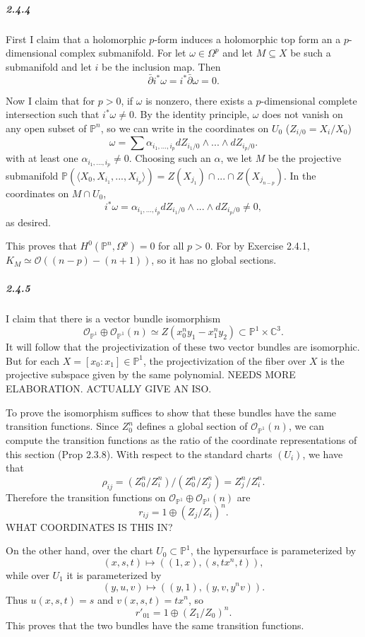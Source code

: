 \documentclass[10pt,letter]{article}
\begin{document}
\subparagraph{2.4.4}
First I claim that a holomorphic $p$-form induces a holomorphic top form an a $p$-dimensional complex submanifold. For let $\omega \in \Omega^p$ and let $M \subseteq X$ be such a submanifold and let $i$ be the inclusion map. Then \[ \bar{\partial} i^{\ast} \omega = i^{\ast} \bar{\partial} \omega = 0.\]

Now I claim that for $p > 0$, if $\omega$ is nonzero, there exists a $p$-dimensional complete intersection such that $i^{\ast} \omega \neq 0$. By the identity principle, $\omega$ does not vanish on any open subset of $\mathbb{P}^n$, so we can write in the coordinates on $U_0$  ($Z_{i/0} = X_i/X_0$) \[ \omega = \sum \alpha_{i_1,...,i_p} dZ_{i_1/0} \wedge ... \wedge dZ_{i_p/0}.\]
with at least one $\alpha_{i_1,...,i_p} \neq 0$. Choosing such an $\alpha$, we let $M$ be the projective submanifold $\mathbb{P}(\langle X_0,X_{i_1},...,X_{i_p} \rangle) = Z(X_{j_1}) \cap ... \cap Z(X_{j_{n-p}})$. In the coordinates on $M \cap U_0$, \[ i^{\ast} \omega = \alpha_{i_1,...,i_p} dZ_{i_1/0} \wedge ... \wedge dZ_{i_p/0} \neq 0,\] as desired. 

This proves that $H^{0}(\mathbb{P}^n,\Omega^p) = 0$ for all $p > 0$. For by Exercise 2.4.1, $K_M \simeq \mathcal{O}((n-p)-(n+1))$, so it has no global sections. 

\subparagraph{2.4.5} I claim that there is a vector bundle isomorphism \[ \mathcal{O}_{\mathbb{P}^1} \oplus \mathcal{O}_{\mathbb{P}^1}(n) \simeq Z(x_0^n y_1 - x_1^n y_2) \subset \mathbb{P}^1 \times \mathbb{C}^3.\] It will follow that the projectivization of these two vector bundles are isomorphic. But for each $X = [x_0:x_1] \in \mathbb{P}^1$, the projectivization of the fiber over $X$ is the projective subspace given by the same polynomial. NEEDS MORE ELABORATION. ACTUALLY GIVE AN ISO. 

To prove the isomorphism suffices to show that these bundles have the same transition functions. Since $Z_0^n$ defines a global section of $\mathcal{O}_{\mathbb{P}^1}(n)$, we can compute the transition functions as the ratio of the coordinate representations of this section (Prop 2.3.8). With respect to the standard charts $(U_i)$, we have that \[ \rho_{ij} = (Z_0^n/Z_i^n)/(Z_0^n/Z_j^n) = Z_j^n/Z_i^n.\] Therefore the transition functions on  $\mathcal{O}_{\mathbb{P}^1} \oplus \mathcal{O}_{\mathbb{P}^1}(n)$ are 
\[ r_{ij} = 1 \oplus (Z_j/Z_i)^n.\]  WHAT COORDINATES IS THIS IN?

On the other hand, over the chart $U_0 \subset \mathbb{P}^1$, the hypersurface is parameterized by
\[ (x,s,t) \mapsto ((1,x),(s,tx^n,t)),\]
while over $U_1$ it is parameterized by
\[ (y,u,v) \mapsto ((y,1),(y,v,y^nv)).\]
Thus $u(x,s,t) = s$ and $v(x,s,t) = tx^n$, so
\[ r'_{01} = 1 \oplus (Z_1/Z_0)^n.\] 
This proves that the two bundles have the same transition functions. 
\end{document}

